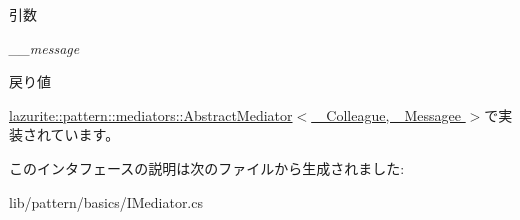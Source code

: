 \begin{DoxyParams}{引数}
\item[{\em \_\-\_\-message}]\end{DoxyParams}
\begin{DoxyReturn}{戻り値}

\end{DoxyReturn}


\hyperlink{classlazurite_1_1pattern_1_1mediators_1_1_abstract_mediator_3_01___colleague_00_01___messagee_01_4_a06ede4a2f26fa304a000175ecad68c9c}{lazurite::pattern::mediators::AbstractMediator$<$ \_\-Colleague, \_\-Messagee $>$}で実装されています。

このインタフェースの説明は次のファイルから生成されました:\begin{DoxyCompactItemize}
\item 
lib/pattern/basics/IMediator.cs\end{DoxyCompactItemize}
